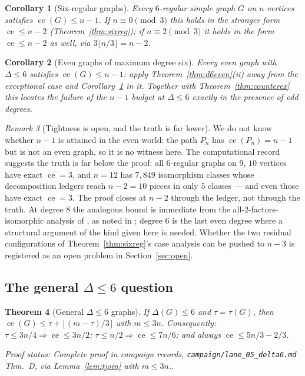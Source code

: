 \documentclass[a4paper,11pt]{amsart}
\newtheorem{theorem}{Theorem}[section]
\newtheorem{corollary}[theorem]{Corollary}
\theoremstyle{definition}
\theoremstyle{remark}
\newtheorem{remark}[theorem]{Remark}
\newcommand{\ce}{\operatorname{ce}}
\newcommand{\proofsrc}[1]{\par\smallskip\noindent\begin{sloppypar}\small\emph{Proof status: #1.}\end{sloppypar}\par\smallskip}
\begin{document}
\begin{corollary}[Six-regular graphs]\label{cor:sixregall}
Every $6$-regular simple graph $G$ on $n$ vertices satisfies $\ce(G)\le n-1$. If $n\equiv0\pmod3$ this
holds in the stronger form $\ce\le n-2$ (Theorem~\ref{thm:sixreg}); if $n\equiv2\pmod3$ it holds in the
form $\ce\le n-2$ as well, via $3\lfloor n/3\rfloor=n-2$.
\end{corollary}

\begin{corollary}[Even graphs of maximum degree six]\label{cor:evend6}
Every even graph with $\Delta\le6$ satisfies $\ce(G)\le n-1$: apply Theorem~\ref{thm:d6even}(ii) away from
the exceptional case and Corollary~\ref{cor:sixregall} in it. Together with Theorem~\ref{thm:counterex}
this locates the failure of the $n-1$ budget at $\Delta\le6$ exactly in the presence of odd degrees.
\end{corollary}

\begin{remark}[Tightness is open, and the truth is far lower]\label{rem:sixregtight}
We do not know whether $n-1$ is attained in the even world: the path $P_n$ has $\ce(P_n)=n-1$ but is not
an even graph, so it is no witness here. The computational record suggests the truth is far below the
proof: all $6$-regular graphs on $9$, $10$ vertices have exact $\ce=3$, and $n=12$ has $7{,}849$
isomorphism classes whose decomposition ledgers reach $n-2=10$ pieces in only $5$ classes --- and even
those have exact $\ce=3$. The proof closes at $n-2$ through the ledger, not through the truth. At degree
$8$ the analogous bound is immediate from the all-$2$-factors-isomorphic analysis of \cite{AAFJLS04}, as
noted in \cite{AABC25}; degree $6$ is the last even degree where a structural argument of the kind given
here is needed. Whether the two residual configurations of Theorem~\ref{thm:sixreg}'s case analysis can be
pushed to $n-3$ is registered as an open problem in Section~\ref{sec:open}.
\end{remark}

\subsection{The general $\Delta\le6$ question}

\begin{theorem}[General $\Delta\le6$ graphs]\label{thm:d6tjoin}
If $\Delta(G)\le6$ and $\tau=\tau(G)$, then $\ce(G)\le\tau+\lfloor(m-\tau)/3\rfloor$ with $m\le3n$.
Consequently: $\tau\le 3n/4\Rightarrow\ce\le 3n/2$; $\tau\le n/2\Rightarrow\ce\le 7n/6$; and always
$\ce\le 5n/3-2/3$.
\end{theorem}
\proofsrc{Complete proof in campaign records, \texttt{campaign/lane\_05\_delta6.md} Thm.~D, via
Lemma~\ref{lem:tjoin} with $m\le3n$.}
\end{document}
